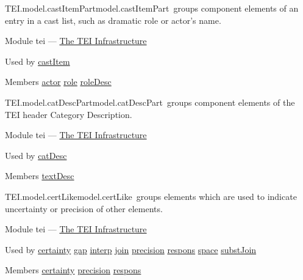 \begin{reflist}
\item[]\begin{specHead}{TEI.model.castItemPart}{model.castItemPart} groups component elements of an entry in a cast list, such as dramatic role or actor's name.\end{specHead} 
    \item[{Module}]
  tei — \hyperref[ST]{The TEI Infrastructure}
    \item[{Used by}]
  \hyperref[TEI.castItem]{castItem}
    \item[{Members}]
  \hyperref[TEI.actor]{actor} \hyperref[TEI.role]{role} \hyperref[TEI.roleDesc]{roleDesc}
\end{reflist}  
\begin{reflist}
\item[]\begin{specHead}{TEI.model.catDescPart}{model.catDescPart} groups component elements of the TEI header Category Description.\end{specHead} 
    \item[{Module}]
  tei — \hyperref[ST]{The TEI Infrastructure}
    \item[{Used by}]
  \hyperref[TEI.catDesc]{catDesc}
    \item[{Members}]
  \hyperref[TEI.textDesc]{textDesc}
\end{reflist}  
\begin{reflist}
\item[]\begin{specHead}{TEI.model.certLike}{model.certLike} groups elements which are used to indicate uncertainty or precision of other elements.\end{specHead} 
    \item[{Module}]
  tei — \hyperref[ST]{The TEI Infrastructure}
    \item[{Used by}]
  \hyperref[TEI.certainty]{certainty} \hyperref[TEI.gap]{gap} \hyperref[TEI.interp]{interp} \hyperref[TEI.join]{join} \hyperref[TEI.precision]{precision} \hyperref[TEI.respons]{respons} \hyperref[TEI.space]{space} \hyperref[TEI.substJoin]{substJoin}
    \item[{Members}]
  \hyperref[TEI.certainty]{certainty} \hyperref[TEI.precision]{precision} \hyperref[TEI.respons]{respons}
\end{reflist}  
